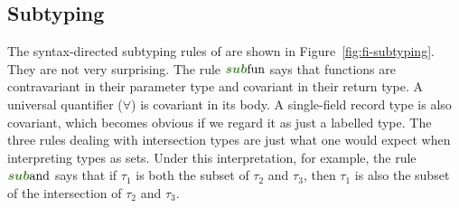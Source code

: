 \subsection{Subtyping}

\begin{comment}
In some calculi, the subtyping relation is external to the language: those
calculi are indifferent to how the subtyping relation is defined. In \name, we
take a syntatic approach, that is, subtyping is due to the syntax of types.
However, this approach does not preclude integrating other forms of subtyping
into our system. One is ``primitive'' subtyping relations such as natural
numbers being a subtype of integers. The other is nominal subtyping relations
that are explicitly declared by the programmer.
\end{comment}

\begin{figure*}
  \small
  
  \caption{Subtyping in \name.}
  \label{fig:fi-subtyping}
\end{figure*}

The syntax-directed subtyping rules of \name are shown in Figure~\ref{fig:fi-subtyping}. They
are not very surprising. The rule $\rulelabelsubfun$ says that functions are
contravariant in their parameter type and covariant in their return type. A
universal quantifier ($\forall$) is covariant in its body. A single-field record
type is also covariant, which becomes obvious if we regard it as just a labelled
type. The three rules dealing with intersection types are just what one would
expect when interpreting types as sets. Under this interpretation, for example,
the rule $\rulelabelsuband$ says that if $\tau_1$ is both the subset of $\tau_2$
and $\tau_3$, then $\tau_1$ is also the subset of the intersection of $\tau_2$
and $\tau_3$.



